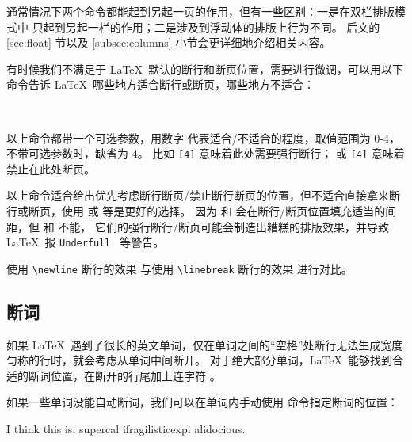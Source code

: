 通常情况下两个命令都能起到另起一页的作用，但有一些区别：一是在双栏排版模式中  只起到另起一栏的作用；二是涉及到浮动体的排版上行为不同。
后文的 \ref{sec:float} 节以及 \ref{subsec:columns} 小节会更详细地介绍相关内容。

有时候我们不满足于 \LaTeX\ 默认的断行和断页位置，需要进行微调，可以用以下命令告诉 \LaTeX\ 哪些地方适合断行或断页，哪些地方不适合：
\begin{command}
 \quad {} \\
 \quad {}
\end{command}

以上命令都带一个可选参数，用数字  代表适合/不适合的程度，取值范围为 0-4，不带可选参数时，缺省为 4。
比如 \texttt{[4]} 意味着此处需要强行断行； 或 \texttt{[4]}
意味着禁止在此处断页。

以上命令适合给出优先考虑断行断页/禁止断行断页的位置，但不适合直接拿来断行或断页，使用  或  等是更好的选择。
因为  和  会在断行/断页位置填充适当的间距，但  和  不能，
它们的强行断行/断页可能会制造出糟糕的排版效果，并导致 \LaTeX\ 报 \texttt{Underfull } 等警告。

\begin{example}
使用 \verb|\newline| 断行的效果
\newline
与使用 \verb|\linebreak| 断行的效果
\linebreak
进行对比。
\end{example}

\subsection{断词}\label{subsec:hyphen}

如果 \LaTeX\ 遇到了很长的英文单词，仅在单词之间的“空格”处断行无法生成宽度匀称的行时，就会考虑从单词中间断开。
对于绝大部分单词，\LaTeX\ 能够找到合适的断词位置，在断开的行尾加上连字符 \char\hyphenchar\font 。

如果一些单词没能自动断词，我们可以在单词内手动使用 \cmd{-} 命令指定断词的位置：
\begin{example}
I think this is: su\-per\-cal\-%
i\-frag\-i\-lis\-tic\-ex\-pi\-%
al\-i\-do\-cious.
\end{example}

\endinput
